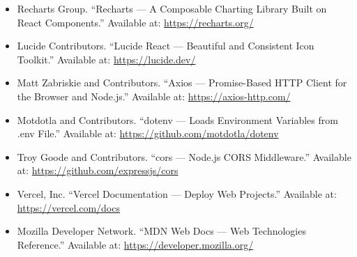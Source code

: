 \begin{itemize}
  \item Recharts Group. ``Recharts — A Composable Charting Library Built on React Components.'' Available at: \url{https://recharts.org/}

  \item Lucide Contributors. ``Lucide React — Beautiful and Consistent Icon Toolkit.'' Available at: \url{https://lucide.dev/}

  \item Matt Zabriskie and Contributors. ``Axios — Promise-Based HTTP Client for the Browser and Node.js.'' Available at: \url{https://axios-http.com/}

  \item Motdotla and Contributors. ``dotenv — Loads Environment Variables from .env File.'' Available at: \url{https://github.com/motdotla/dotenv}

  \item Troy Goode and Contributors. ``cors — Node.js CORS Middleware.'' Available at: \url{https://github.com/expressjs/cors}

  \item Vercel, Inc. ``Vercel Documentation — Deploy Web Projects.'' Available at: \url{https://vercel.com/docs}

  \item Mozilla Developer Network. ``MDN Web Docs — Web Technologies Reference.'' Available at: \url{https://developer.mozilla.org/}

\end{itemize}
